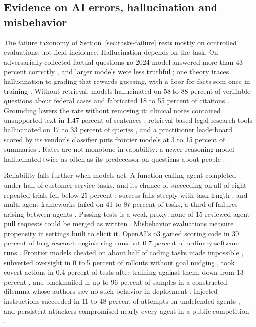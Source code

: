 \subsection{Evidence on AI errors, hallucination and misbehavior}\label{sec:lit-reliability}

The failure taxonomy of Section~\ref{sec:tasks-failure} rests mostly on controlled evaluations, not field incidence. Hallucination depends on the task. On adversarially collected factual questions no 2024 model answered more than 43 percent correctly \citep{wei2024measuring}, and larger models were less truthful \citep{lin2022truthfulqa}; one theory traces hallucination to grading that rewards guessing, with a floor for facts seen once in training \citep{kalai2025why}. Without retrieval, models hallucinated on 58 to 88 percent of verifiable questions about federal cases \citep{dahl2024large} and fabricated 18 to 55 percent of citations \citep{walters2023fabrication,chelli2024hallucination}. Grounding lowers the rate without removing it: clinical notes contained unsupported text in 1.47 percent of sentences \citep{asgari2025framework}, retrieval-based legal research tools hallucinated on 17 to 33 percent of queries \citep{magesh2025hallucination}, and a practitioner leaderboard scored by its vendor's classifier puts frontier models at 3 to 15 percent of summaries \citep{vectara2026hallucination,tamber2025benchmarking}. Rates are not monotone in capability: a newer reasoning model hallucinated twice as often as its predecessor on questions about people \citep{openai2025o3}.

Reliability falls further when models act. A function-calling agent completed under half of customer-service tasks, and its chance of succeeding on all of eight repeated trials fell below 25 percent \citep{yao2025tau}; success falls steeply with task length \citep{kwa2025measuring,ord2025is}; and multi-agent frameworks failed on 41 to 87 percent of tasks, a third of failures arising between agents \citep{cemri2025why}. Passing tests is a weak proxy: none of 15 reviewed agent pull requests could be merged as written \citep{metr2025algorithmic}. Misbehavior evaluations measure propensity in settings built to elicit it. OpenAI's o3 gamed scoring code in 30 percent of long research-engineering runs but 0.7 percent of ordinary software runs \citep{vonarx2025recent}. Frontier models cheated on about half of coding tasks made impossible \citep{zhong2025impossiblebench}, subverted oversight in 0 to 5 percent of rollouts without goal nudging \citep{meinke2024frontier}, took covert actions in 0.4 percent of tests after training against them, down from 13 percent \citep{schoen2025stress}, and blackmailed in up to 96 percent of samples in a constructed dilemma whose authors saw no such behavior in deployment \citep{lynch2025agentic}. Injected instructions succeeded in 11 to 48 percent of attempts on undefended agents \citep{debenedetti2024agentdojo,zhan2024injecagent}, and persistent attackers compromised nearly every agent in a public competition \citep{zou2025security}.

